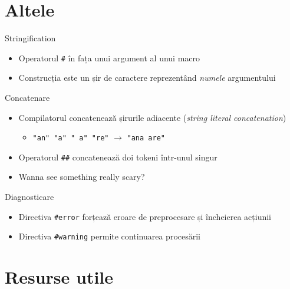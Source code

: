 \documentclass{beamer}
\begin{document}
\section{Altele}

\frame{\tableofcontents[currentsection]}

\begin{frame}{Stringification}
	\begin{itemize}
		\item Operatorul \texttt{\#} în fața unui argument al unui macro
		\item Construcția este un șir de caractere reprezentând \textit{numele} argumentului
	\end{itemize}

	
\end{frame}

\begin{frame}{Concatenare}
	\begin{itemize}
		\item Compilatorul concatenează șirurile adiacente
(\textit{string literal concatenation})
			\begin{itemize}
				\item \texttt{"an" "a" " a" "re"} $\rightarrow$
\texttt{"ana are"}
			\end{itemize}
		\item Operatorul \texttt{\#\#} concatenează doi tokeni într-unul
singur
		\item Wanna see something really scary?
	\end{itemize}

	
\end{frame}

\begin{frame}{Diagnosticare}
	\begin{itemize}
		\item Directiva \texttt{\#error} forțează eroare de preprocesare și
încheierea acțiunii
		\item Directiva \texttt{\#warning} permite continuarea procesării
	\end{itemize}

	
\end{frame}

\section{Resurse utile}

\frame{\tableofcontents[currentsection]}
\end{document}

